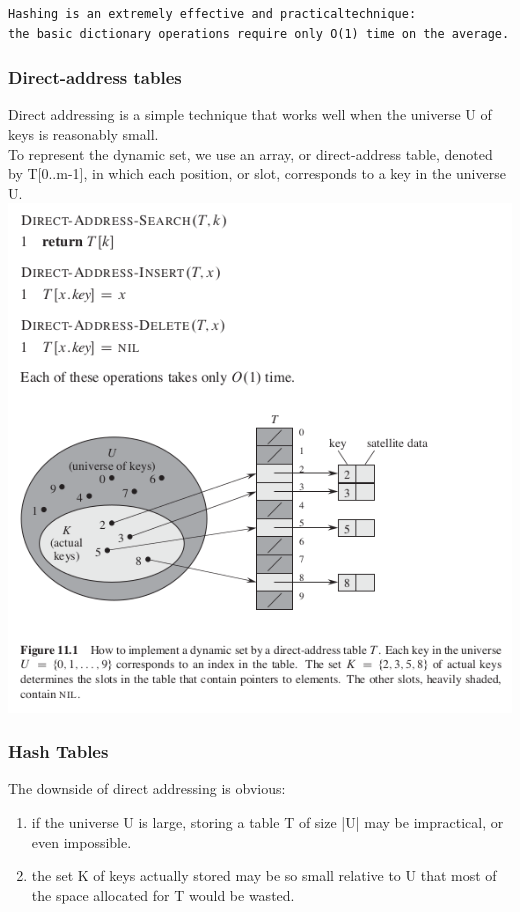 \documentclass[11pt]{article}
\begin{document}
\begin{verbatim}
Hashing is an extremely effective and practicaltechnique: 
the basic dictionary operations require only O(1) time on the average.
\end{verbatim}


\subsubsection{Direct-address tables}
\label{sec-4-2-1}
Direct addressing is a simple technique that works well when the universe U of keys is reasonably small. \\


To represent the dynamic set, we use an array, or direct-address table, denoted by T[0..m-1], in which each position, or slot, corresponds to a key in the universe U. \\

\includegraphics[width=.9\linewidth]{pics/c11_direct_address_table.png} \\

\subsubsection{Hash Tables}
\label{sec-4-2-2}
The downside of direct addressing is obvious: \\
\begin{enumerate}
\item if the universe U is large, storing a table T of size |U| may be impractical, or even impossible. \\
\item the set K of keys actually stored may be so small relative to U that most of the space allocated for T would be wasted. \\
\end{enumerate}
\end{document}
